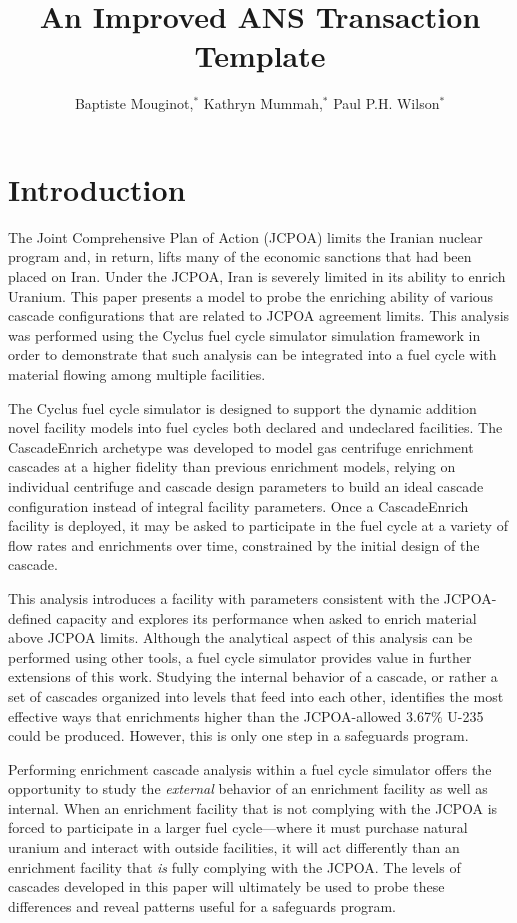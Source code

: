 \documentclass{anstrans}
\title{An Improved ANS Transaction Template}
\author{Baptiste Mouginot,$^{*}$ Kathryn Mummah,$^{*}$ Paul P.H. Wilson$^{*}$}
\institute{
$^{*}$University of Wisconsin-Madison, WI
}
\begin{document}
\section{Introduction}

The Joint Comprehensive Plan of Action (JCPOA)\cite{jcpoa} %
limits the Iranian nuclear program and, in return, lifts many of the economic
sanctions that had been placed on Iran. Under the JCPOA, Iran is severely
limited in its ability to enrich Uranium. This paper presents a model to probe
the enriching ability of various cascade configurations that are related to
JCPOA agreement limits. This analysis was performed using the Cyclus fuel cycle
simulator\cite{cyclus} %
simulation framework in order to demonstrate that such analysis can be
integrated into a fuel cycle with material flowing among multiple facilities.

The Cyclus fuel cycle simulator is designed to support the dynamic addition
novel facility models into fuel cycles both declared and undeclared facilities.
The CascadeEnrich archetype\cite{mbmore.2018} was developed to model gas centrifuge
enrichment cascades at a higher fidelity than previous enrichment models,
relying on individual centrifuge and cascade design parameters to build an ideal
cascade configuration instead of integral facility parameters. Once a
CascadeEnrich facility is deployed, it may be asked to participate in the fuel
cycle at a variety of flow rates and enrichments over time, constrained by the
initial design of the cascade.

This analysis introduces a facility with parameters consistent with the
JCPOA-defined capacity and explores its performance when asked to enrich
material above JCPOA limits. Although the analytical aspect of this analysis can
be performed using other tools, a fuel cycle simulator provides value in further
extensions of this work. Studying the internal behavior of a cascade, or rather
a set of cascades organized into levels that feed into each other, identifies
the most effective ways that enrichments higher than the JCPOA-allowed 3.67\%
U-235 could be produced. However, this is only one step in a safeguards program.

Performing enrichment cascade analysis within a fuel cycle simulator offers the
opportunity to study the \textit{external} behavior of an enrichment facility as
well as internal. When an enrichment facility that is not complying with the
JCPOA is forced to participate in a larger fuel cycle---where it must purchase
natural uranium and interact with outside facilities, it will act differently
than an enrichment facility that \textit{is} fully complying with the JCPOA. The
levels of cascades developed in this paper will ultimately be used to probe
these differences and reveal patterns useful for a safeguards program.
\end{document}
